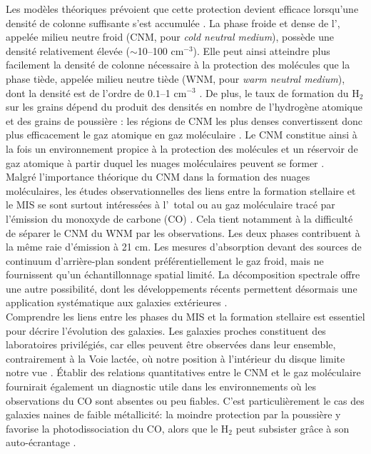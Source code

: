 Les modèles théoriques prévoient que cette protection devient efficace lorsqu'une densité de colonne suffisante s'est accumulée \citep{Krumholz2009, Sternberg2014}. La phase froide et dense de l'\HI, appelée milieu neutre froid (CNM, pour \textit{cold neutral medium}), possède une densité relativement élevée ($\sim$10--100 cm$^{-3}$). Elle peut ainsi atteindre plus facilement la densité de colonne nécessaire à la protection des molécules que la phase tiède, appelée milieu neutre tiède (WNM, pour \textit{warm neutral medium}), dont la densité est de l'ordre de $0.1$--1 cm$^{-3}$ \citep{Krumholz2009, Sternberg2014, Syed2020}. De plus, le taux de formation du H$_2$ sur les grains dépend du produit des densités en nombre de l'hydrogène atomique et des grains de poussière : les régions de CNM les plus denses convertissent donc plus efficacement le gaz atomique en gaz moléculaire \citep{Hollenbach1979, Wakelam2017}. Le CNM constitue ainsi à la fois un environnement propice à la protection des molécules et un réservoir de gaz atomique à partir duquel les nuages moléculaires peuvent se former \citep{Wolfire2003, Klessen2016}.\\\indent
Malgré l'importance théorique du CNM dans la formation des nuages moléculaires, les études observationnelles des liens entre la formation stellaire et le MIS se sont surtout intéressées à l'\HI\ total ou au gaz moléculaire tracé par l'émission du monoxyde de carbone (CO) \citep{Kennicutt1998, Fbigiel2008, Leroy2008}. Cela tient notamment à la difficulté de séparer le CNM du WNM par les observations. Les deux phases contribuent à la même raie d'émission à 21 cm. Les mesures d'absorption devant des sources de continuum d'arrière-plan sondent préférentiellement le gaz froid, mais ne fournissent qu'un échantillonnage spatial limité. La décomposition spectrale offre une autre possibilité, dont les développements récents permettent désormais une application systématique aux galaxies extérieures \citep{Heiles2003a, Marchal2019, Syed2020}.\\\indent
Comprendre les liens entre les phases du MIS et la formation stellaire est essentiel pour décrire l'évolution des galaxies. Les galaxies proches constituent des laboratoires privilégiés, car elles peuvent être observées dans leur ensemble, contrairement à la Voie lactée, où notre position à l'intérieur du disque limite notre vue \citep{Leroy2008}. Établir des relations quantitatives entre le CNM et le gaz moléculaire fournirait également un diagnostic utile dans les environnements où les observations du CO sont absentes ou peu fiables. C'est particulièrement le cas des galaxies naines de faible métallicité: la moindre protection par la poussière y favorise la photodissociation du CO, alors que le H$_2$ peut subsister grâce à son auto-écrantage \citep{Bolatto2013}.\\\indent
